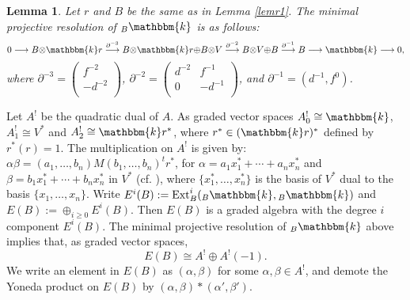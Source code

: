 \documentclass[a4paper]{amsart}
\newtheorem{lem}[thm]{Lemma}
\begin{document}
\begin{lem} Let $r$ and $B$ be the same as in Lemma \ref{lemr1}. The minimal projective resolution of ${}_B{\mathbbm{k}}$ is as follows:
$$0\longrightarrow B{\otimes} {\mathbbm{k}} r\overset{\partial^{-3}}\longrightarrow B{\otimes} {\mathbbm{k}} r{\oplus} B{\otimes} V\overset{\partial^{-2}}\longrightarrow B{\otimes} V{\oplus} B\overset{\partial^{-1}}\longrightarrow B\longrightarrow{\mathbbm{k}}\longrightarrow0,$$ where $\partial^{-3}=\left(
                                                                                                     \begin{array}{c}
                                                                                                       f^{-2} \\
                                                                                                       -d^{-2} \\
                                                                                                     \end{array}
                                                                                                   \right)
$, $\partial^{-2}=\left(
                    \begin{array}{cc}
                      d^{-2} & f^{-1} \\
                      0 & -d^{-1} \\
                    \end{array}
                  \right)
$, and $\partial^{-1}=\left(d^{-1},f^{0}\right)$.
\end{lem}
Let $A^!$ be the quadratic dual of $A$. As graded vector spaces $A^!_0\cong {\mathbbm{k}}$, $A^!_1\cong V^*$ and $A^!_2\cong {\mathbbm{k}} r^*$, where $r^*\in ({\mathbbm{k}} r)^*$ defined by $r^*(r)=1$. The multiplication on $A^!$ is given by: $\alpha\beta=(a_1,\dots,b_n)M(b_1,\dots,b_n)^tr^*$, for $\alpha=a_1x_1^*+\cdots+a_nx_n^*$ and $\beta=b_1x_1^*+\cdots+b_nx_n^*$ in $V^*$ (cf. \cite[Section 3]{HVZ2}), where $\{x^*_1,\dots,x^*_n\}$ is the basis of $V^*$ dual to the basis $\{x_1,\dots,x_n\}$. Write $E^i(B):={\operatorname {Ext}}_B^i({}_B{\mathbbm{k}},{}_B{\mathbbm{k}})$ and $E(B):={\oplus}_{i\ge0}E^i(B)$. Then $E(B)$ is a graded algebra with the degree $i$ component $E^i(B)$. The minimal projective resolution of ${}_B{\mathbbm{k}}$ above implies that, as graded vector spaces,
\begin{equation}\label{eq3}
 E(B)\cong A^!{\oplus} A^!(-1).
\end{equation}
We write an element in $E(B)$ as $(\alpha,\beta)$ for some $\alpha, \beta\in A^!$, and demote the Yoneda product on $E(B)$ by $(\alpha,\beta)*(\alpha',\beta')$.
\end{document}
